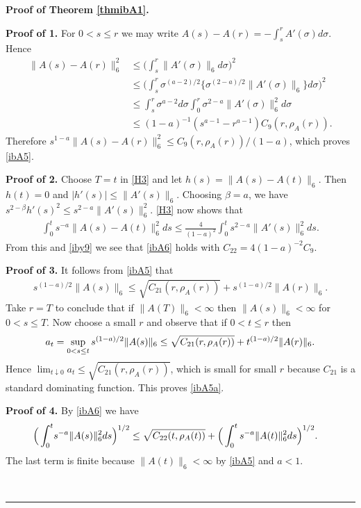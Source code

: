 \documentclass[12pt]{article}
\newenvironment{proof}[1][Proof]{\textbf{#1.} }{\ \rule{0.5em}{0.5em}}
\def \({\Big(}
\def \){\Big)}
\def \beq{\begin{equation}}
\def \eeq{\end{equation}}
\def \eref{\eqref}
\def \s{\sigma}
\numberwithin{equation}{section}
\begin{document}
\bigskip
\noindent
 \begin{proof}[Proof of Theorem \ref{thmibA1}]
 
 \bigskip
 \noindent 
  {\bf Proof of 1.}  
     For $ 0 < s \le r$ we may write  $A(s) - A(r) = - \int_s^r  A'(\sigma) d\sigma$.
  Hence 
 \begin{align*}
 \| A(s) - A(r)\|_6^2 &\le \(\int_s^{r} \|A'(\sigma)\|_6 d\sigma\)^2 \\
& \le \(\int_s^r \s^{(a-2)/2}\{\sigma^{(2-a)/2} \|A'(\sigma)\|_6\} d\s\)^2 \\
&\le \int_s^{r} \s^{a-2} d\s \int_0^{r}  \s^{2-a} \| A'(\s)\|_6^2 d\s \\
&\le (1-a)^{-1}(s^{a-1} - r^{a-1}) C_9(r,\rho_A(r)).
 \end{align*}
 Therefore      $s^{1-a}\| A(s) - A(r)\|_6^2 \le  C_9(r,\rho_A(r))/(1-a)$, 
 which proves \eref{ibA5}. 
 
 
\bigskip
\noindent
{\bf Proof of  2.} Choose $T = t$ in  \eref{H3} 
 and let $h(s) = \|A(s) - A(t)\|_6$. Then $h(t) =0$ and 
 $|h'(s)| \le \|A'(s)\|_6$.  Choosing $\beta =a$, we have
 $s^{2-\beta}h'(s)^2 \le s^{2-a} \| A'(s)\|_6^2$. 
  \eref{H3} now shows that
  \begin{align}
  \int_0^t s^{-a} \| A(s) - A(t)\|_6^2 ds \le \frac{4}{(1-a)^2} \int_0^t s^{2-a} \|A'(s)\|_6^2 ds. \label{ibA22}
    \end{align}
    From this and \eref{iby9} we see that \eref{ibA6} holds with $C_{22} = 4(1-a)^{-2} C_9$.
 


 
 \bigskip
 \noindent
 {\bf Proof of 3.} It follows  from \eref{ibA5} that 
  \begin{align}
s^{(1-a)/2}\| A(s)\|_6 \le \sqrt{ C_{21}(r,\rho_A(r))} + s^{(1-a)/2}\|A(r)\|_6.    \label{ibA23}
\end{align}
Take $r= T$ to conclude that if $\|A(T)\|_6 < \infty$ then $\|A(s)\|_6 < \infty$
 for $ 0 < s \le T$. Now choose a small $r$ and observe that if  $0 <t \le r$ then 
 \beq
a_t = \sup_{0< s \le t} s^{(1-a)/2}\| A(s)\|_6  \le \sqrt{ C_{21}(r,\rho_A(r))}  + t^{(1-a)/2}\|A(r)\|_6. \notag
\eeq
Hence $\lim_{t\downarrow 0}a_t \le  \sqrt{ C_{21}(r,\rho_A(r))} $,  
which is small for small $r$  because $C_{21}$ is a standard dominating function. 
This proves   \eref{ibA5a}.

\bigskip
 \noindent
 {\bf Proof of 4.}  By \eref{ibA6} we have
 \begin{align}
 \( \int_0^t& s^{-a} \| A(s)\|_6^2 ds\)^{1/2} 
              \le \sqrt{C_{22}(t, \rho_A(t))}  +\(\int_0^t s^{-a} \|A(t)\|_6^2 ds\)^{1/2}.        \notag
 \end{align}
 The last term is finite because $\|A(t)\|_6 < \infty$ by \eref{ibA5} and $a < 1$.




\end{proof}
\end{document}
